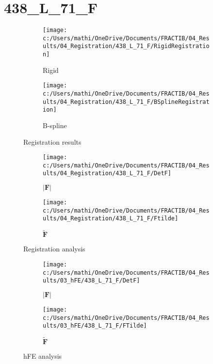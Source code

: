 \documentclass{article}%
\begin{document}
%
\newpage%
\section*{438\_L\_71\_F}%
\label{sec:438L71F}%


\begin{figure}[h!]%
\begin{subfigure}[b]{0.5\linewidth}%
\texttt{[image: c:/Users/mathi/OneDrive/Documents/FRACTIB/04\_Results/04\_Registration/438\_L\_71\_F/RigidRegistration]}%
\caption{Rigid}%
\end{subfigure}%
\begin{subfigure}[b]{0.5\linewidth}%
\texttt{[image: c:/Users/mathi/OneDrive/Documents/FRACTIB/04\_Results/04\_Registration/438\_L\_71\_F/BSplineRegistration]}%
\caption{B{-}spline}%
\end{subfigure}%
\caption{Registration results}%
\end{figure}

%


\begin{figure}[h!]%
\begin{subfigure}[b]{0.5\linewidth}%
\texttt{[image: c:/Users/mathi/OneDrive/Documents/FRACTIB/04\_Results/04\_Registration/438\_L\_71\_F/DetF]}%
\caption{$|\mathbf{F}|$}%
\end{subfigure}%
\begin{subfigure}[b]{0.5\linewidth}%
\texttt{[image: c:/Users/mathi/OneDrive/Documents/FRACTIB/04\_Results/04\_Registration/438\_L\_71\_F/Ftilde]}%
\caption{$\tilde{\mathbf{F}}$}%
\end{subfigure}%
\caption{Registration analysis}%
\end{figure}

%


\begin{figure}[h!]%
\begin{subfigure}[b]{0.5\linewidth}%
\texttt{[image: c:/Users/mathi/OneDrive/Documents/FRACTIB/04\_Results/03\_hFE/438\_L\_71\_F/DetF]}%
\caption{$|\mathbf{F}|$}%
\end{subfigure}%
\begin{subfigure}[b]{0.5\linewidth}%
\texttt{[image: c:/Users/mathi/OneDrive/Documents/FRACTIB/04\_Results/03\_hFE/438\_L\_71\_F/FTilde]}%
\caption{$\tilde{\mathbf{F}}$}%
\end{subfigure}%
\caption{hFE analysis}%
\end{figure}
\end{document}
